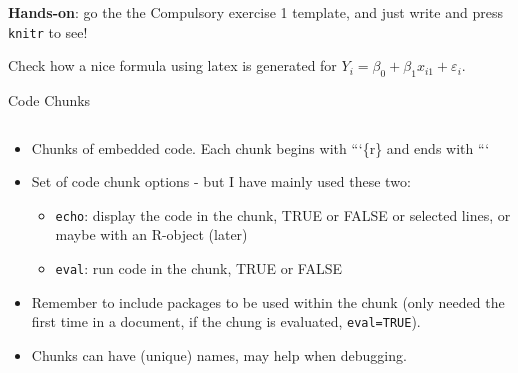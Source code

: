 \documentclass[10pt,ignorenonframetext,]{beamer}
\providecommand{\tightlist}{%
  \setlength{\itemsep}{0pt}\setlength{\parskip}{0pt}}
\begin{document}
\begin{frame}[fragile]

\textbf{Hands-on}: go the the Compulsory exercise 1 template, and just
write and press \texttt{knitr} to see!

Check how a nice formula using latex is generated for
\(Y_i=\beta_0+\beta_1 x_{i1} +\varepsilon_i\).

\end{frame}

\begin{frame}[fragile]

\begin{block}{Code Chunks}

\(~\)

\begin{itemize}
\tightlist
\item
  Chunks of embedded code. Each chunk begins with ```\{r\} and ends with
  ```
\end{itemize}

\vspace{2mm}

\begin{itemize}
\tightlist
\item
  Set of code chunk options - but I have mainly used these two:

  \begin{itemize}
  \tightlist
  \item
    \texttt{echo}: display the code in the chunk, TRUE or FALSE or
    selected lines, or maybe with an R-object (later)
  \item
    \texttt{eval}: run code in the chunk, TRUE or FALSE
  \end{itemize}
\end{itemize}

\vspace{2mm}

\begin{itemize}
\tightlist
\item
  Remember to include packages to be used within the chunk (only needed
  the first time in a document, if the chung is evaluated,
  \texttt{eval=TRUE}).
\end{itemize}

\vspace{2mm}

\begin{itemize}
\tightlist
\item
  Chunks can have (unique) names, may help when debugging.
\end{itemize}


\end{block}
\end{frame}
\end{document}
